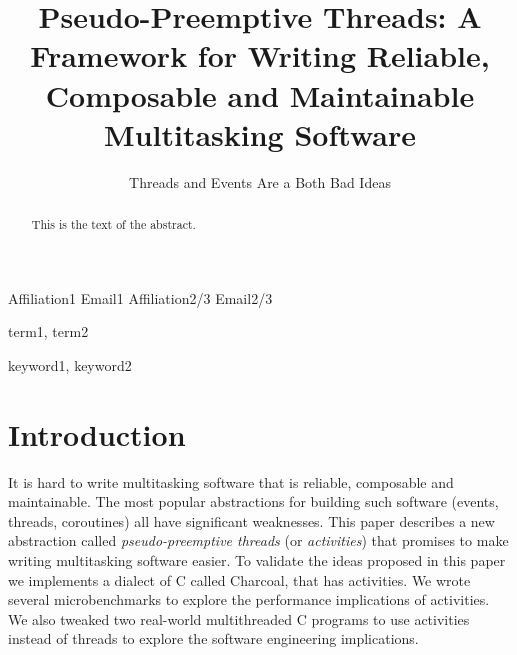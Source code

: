 \documentclass[10pt,preprint]{sigplanconf}
\begin{document}
\newcommand{\charcoal}{Charcoal}

\setlength{\pdfpageheight}{\paperheight}
\setlength{\pdfpagewidth}{\paperwidth}



\title{Pseudo-Preemptive Threads: A Framework for Writing Reliable, Composable and Maintainable Multitasking Software}
\subtitle{Threads and Events Are a Both Bad Ideas}

           {Affiliation1}
           {Email1}
           {Affiliation2/3}
           {Email2/3}

\maketitle

\begin{abstract}
This is the text of the abstract.
\end{abstract}


\terms
term1, term2

\keywords
keyword1, keyword2

\section{Introduction}

It is hard to write multitasking software that is reliable, composable and maintainable.
The most popular abstractions for building such software (events, threads, coroutines) all have significant weaknesses.
This paper describes a new abstraction called \emph{pseudo-preemptive threads} (or \emph{activities}) that promises to make writing multitasking software easier.
To validate the ideas proposed in this paper we implements a dialect of C called \charcoal, that has activities.
We wrote several microbenchmarks to explore the performance implications of activities.
We also tweaked two real-world multithreaded C programs to use activities instead of threads to explore the software engineering implications.
\end{document}
